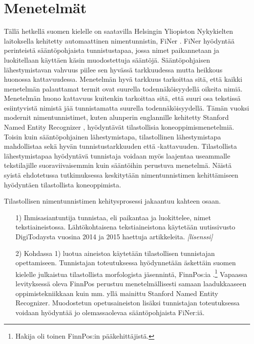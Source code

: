 \documentclass[12pt,a4paper,finnish,oneside]{article}
\newcommand{\fixme}[1]{\textsl{[#1]}}
\begin{document}
\section{Menetelmät}

Tällä hetkellä suomen kielelle on saatavilla Helsingin Yliopiston Nykykielten laitoksella kehitetty automaattinen nimentunnistin, FiNer \cite{}. FiNer hyödyntää perinteistä sääntöpohjaista tunnistustapaa, jossa nimet paikannetaan ja luokitellaan käyttäen käsin muodostettuja sääntöjä. Sääntöpohjaisen lähestymistavan vahvuus piilee sen hyvässä tarkkuudessa mutta heikkous huonossa kattavuudessa. Menetelmän hyvä tarkkuus tarkoittaa sitä, että kaikki menetelmän palauttamat termit ovat suurella todennäköisyydellä oikeita nimiä. Menetelmän huono kattavuus kuitenkin tarkoittaa sitä, että suuri osa tekstissä esiintyvistä nimistä jää tunnistamatta suurella todennäköisyydellä. Tämän vuoksi modernit nimentunnistimet, kuten alunperin englannille kehitetty Stanford Named Entity Recognizer \cite{stanfordner}, hyödyntävät tilastollisia koneoppimismenetelmiä. Toisin kuin sääntöpohjainen lähestymistapa, tilastollinen lähestymistapa mahdollistaa sekä hyvän tunnistustarkkuuden että -kattavuuden. Tilastollista lähestymistapaa hyödyntävä tunnistaja voidaan myös laajentaa useammalle tekstilajille suoraviivaisemmin kuin sääntöihin perustuva menetelmä. Näistä syistä ehdotetussa tutkimuksessa keskitytään nimentunnistimen kehittämiseen hyödyntäen tilastollista koneoppimista.

Tilastollisen nimentunnistimen kehitysprosessi jakaantuu kahteen osaan. 

\begin{itemize}

\item[1)] Ihmisasiantuntija tunnistaa, eli paikantaa ja luokittelee, nimet tekstiaineistossa. Lähtökohtaisena tekstiaineistona käytetään uutissivusto DigiTodaysta vuosina 2014 ja 2015 haettuja artikkeleita. \fixme{lisenssi}

\item[2)] Kohdassa 1) luotua aineistoa käytetään tilastollisen tunnistajan opettamiseen. Tunnistajan toteutuksessa hyödynnetään äskettäin suomen kielelle julkaistua tilastollista morfologista jäsennintä, FinnPos:ia \cite{silfverberg2015}\cite{finnpos}.\footnote{Hakija oli toinen FinnPos:in pääkehittäjistä.} Vapaassa levityksessä oleva FinnPos perustuu menetelmällisesti samaan laadukkaaseen oppimistekniikkaan kuin mm. yllä mainittu Stanford Named Entity Recognizer. Muodostetun opetusaineiston lisäksi tunnistajan toteutuksessa voidaan hyödyntää jo olemassaolevaa sääntöpohjaista FiNer:iä.

\end{itemize}
\end{document}
